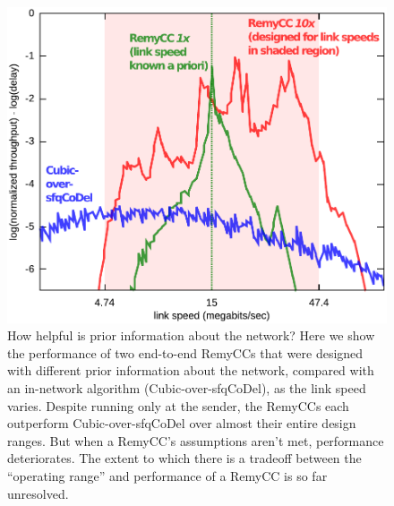 \documentclass{article}
\begin{document}
\begin{figure}
\begin{centering}
\includegraphics[width=8 cm]{spec-web.pdf}
\caption{How helpful is prior information about the network? Here we
  show the performance of two end-to-end RemyCCs that were designed
  with different prior information about the network, compared with an
  in-network algorithm (Cubic-over-sfqCoDel), as the link speed
  varies. Despite running only at the sender, the RemyCCs each
  outperform Cubic-over-sfqCoDel over almost their entire design
  ranges. But when a RemyCC's assumptions aren't met, performance
  deteriorates. The extent to which there is a tradeoff between
  the ``operating range'' and performance of a RemyCC is so far unresolved.}
\label{f:remy-spec}
\end{centering}
\end{figure}
\end{document}
